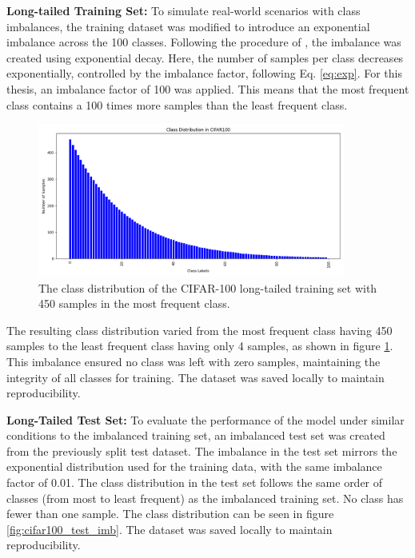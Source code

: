 \textbf{Long-tailed Training Set:} To simulate real-world scenarios with class imbalances, the training dataset was modified to introduce an exponential imbalance across the 100 classes. Following the procedure of \cite{cao2019learningimbalanceddatasetslabeldistributionaware}, the imbalance was created using exponential decay. Here, the number of samples per class decreases exponentially, controlled by the imbalance factor, following Eq. \eqref{eq:exp}. For this thesis, an imbalance factor of 100 was applied. This means that the most frequent class contains a 100 times more samples than the least frequent class. 

\begin{figure}[h!]
    \centering
    \includegraphics[width=0.9\textwidth]{Images/Plots/cifar100_train_450_imb.png}
    \caption{The class distribution of the CIFAR-100 long-tailed training set with 450 samples in the most frequent class.}
    \label{fig:cifar100_train_450_imb}
\end{figure}

The resulting class distribution varied from the most frequent class having 450 samples to the least frequent class having only 4 samples, as shown in figure \ref{fig:cifar100_train_450_imb}. This imbalance ensured no class was left with zero samples, maintaining the integrity of all classes for training. The dataset was saved locally to maintain reproducibility.


\textbf{Long-Tailed Test Set:} To evaluate the performance of the model under similar conditions to the imbalanced training set, an imbalanced test set was created from the previously split test dataset. The imbalance in the test set mirrors the exponential distribution used for the training data, with the same imbalance factor of 0.01. The class distribution in the test set follows the same order of classes (from most to least frequent) as the imbalanced training set. No class has fewer than one sample. The class distribution can be seen in figure \ref{fig:cifar100_test_imb}. The dataset was saved locally to maintain reproducibility.

